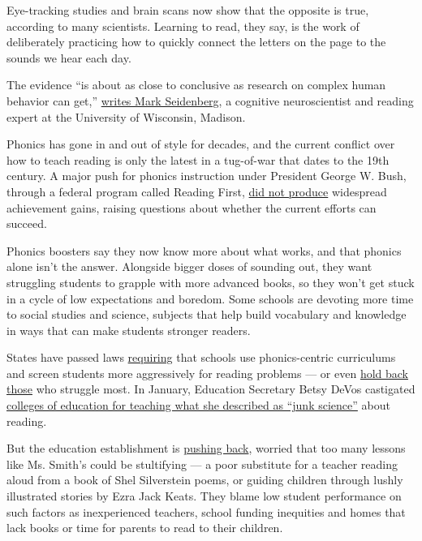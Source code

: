 Eye-tracking studies and brain scans now show that the opposite is true,
according to many scientists. Learning to read, they say, is the work of
deliberately practicing how to quickly connect the letters on the page
to the sounds we hear each day.

The evidence ``is about as close to conclusive as research on complex
human behavior can get,''
\href{https://www.amazon.com/Language-Speed-Sight-Can\%C2\%92t-About/dp/0465019323}{writes
Mark Seidenberg}, a cognitive neuroscientist and reading expert at the
University of Wisconsin, Madison.

Phonics has gone in and out of style for decades, and the current
conflict over how to teach reading is only the latest in a tug-of-war
that dates to the 19th century. A major push for phonics instruction
under President George W. Bush, through a federal program called Reading
First,
\href{https://www.mdrc.org/sites/default/files/understanding_reading_first.pdf}{did
not produce} widespread achievement gains, raising questions about
whether the current efforts can succeed.

Phonics boosters say they now know more about what works, and that
phonics alone isn't the answer. Alongside bigger doses of sounding out,
they want struggling students to grapple with more advanced books, so
they won't get stuck in a cycle of low expectations and boredom. Some
schools are devoting more time to social studies and science, subjects
that help build vocabulary and knowledge in ways that can make students
stronger readers.

States have passed laws
\href{http://dese.ade.arkansas.gov/divisions/learning-services/r.i.s.e.-arkansas/its-all-about-meaning}{requiring}
that schools use phonics-centric curriculums and screen students more
aggressively for reading problems --- or even
\href{https://www.ncsl.org/documents/legisbriefs/2018/june/LBJune2018_A_Look_at_Third_Grade_Reading_Retention_Policies_goID32459.pdf}{hold
back those} who struggle most. In January, Education Secretary Betsy
DeVos castigated
\href{https://twitter.com/BetsyDeVosED/status/1221912011451224064}{colleges
of education for teaching what she described as ``junk science''} about
reading.

But the education establishment is
\href{https://ncte.org/statement/the-act-of-reading/}{pushing back},
worried that too many lessons like Ms. Smith's could be stultifying ---
a poor substitute for a teacher reading aloud from a book of Shel
Silverstein poems, or guiding children through lushly illustrated
stories by Ezra Jack Keats. They blame low student performance on such
factors as inexperienced teachers, school funding inequities and homes
that lack books or time for parents to read to their children.

